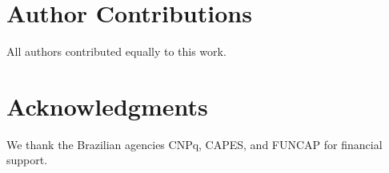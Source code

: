 \documentclass[aps,physrev,preprint,groupedaddress,linenumbers]{revtex4-2}
\begin{document}
\section{Author Contributions}
All authors contributed equally to this work.

\section{Acknowledgments}
We thank the Brazilian agencies CNPq, CAPES, and FUNCAP for financial support.



%


\end{document}
